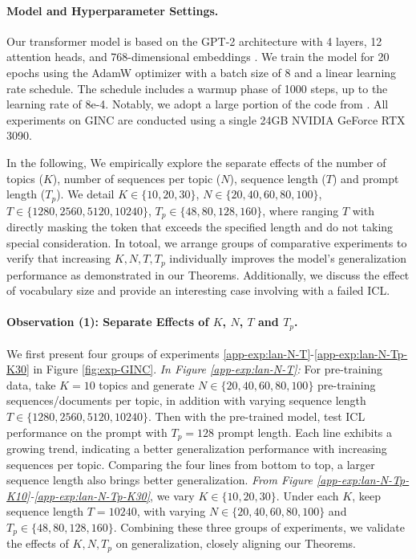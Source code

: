 \paragraph{Model and Hyperparameter Settings.} Our transformer model is based on the GPT-2 architecture with 4 layers, 12 attention heads, and 768-dimensional embeddings \citep{wolf2019huggingface}. We train the model for 20 epochs using the AdamW optimizer with a batch size of 8 and a linear learning rate schedule. The schedule includes a warmup phase of 1000 steps, up to the learning rate of 8e-4. Notably, we adopt a large portion of the code from \cite{xie2021explanation}. All experiments on GINC are conducted using a single 24GB NVIDIA GeForce RTX 3090.

In the following, We empirically explore the separate effects of the number of topics ($K$), number of sequences per topic ($N$), sequence length ($T$) and prompt length ($T_p$). We detail $K \in \{10,20,30\}$, $N \in \{20,40,60,80,100\}$, $T \in \{1280, 2560, 5120, 10240\}$, $T_p \in \{48, 80, 128, 160\}$, where ranging $T$ with directly masking the token that exceeds the specified length and do not taking special consideration. In totoal, we arrange groups of comparative experiments to verify that increasing $K, N, T, T_p$ individually improves the model's generalization performance as demonstrated in our Theorems. Additionally, we discuss the effect of vocabulary size and provide an interesting case involving with a failed ICL.

\paragraph{Observation (1): Separate Effects of $K$, $N$, $T$ and $T_p$.} We first present four groups of experiments \ref{app-exp:lan-N-T}-\ref{app-exp:lan-N-Tp-K30} in Figure \ref{fig:exp-GINC}. \textit{In Figure \ref{app-exp:lan-N-T}:} For pre-training data, take $K=10$ topics and generate $N \in \{20,40,60,80,100\}$ pre-training sequences/documents per topic, in addition with varying sequence length $T \in \{1280, 2560, 5120, 10240\}$. Then with the pre-trained model, test ICL performance on the prompt with $T_p=128$ prompt length. Each line exhibits a growing trend, indicating a better generalization performance with increasing sequences per topic. Comparing the four lines from bottom to top, a larger sequence length also brings better generalization. \textit{From Figure \ref{app-exp:lan-N-Tp-K10}-\ref{app-exp:lan-N-Tp-K30}}, we vary $K\in \{10,20,30\}$. Under each $K$, keep sequence length $T=10240$, with varying $N \in \{20,40,60,80,100\}$ and $T_p \in \{48, 80, 128, 160\}$. Combining these three groups of experiments, we validate the effects of $K,N,T_p$ on generalization, closely aligning our Theorems. 

